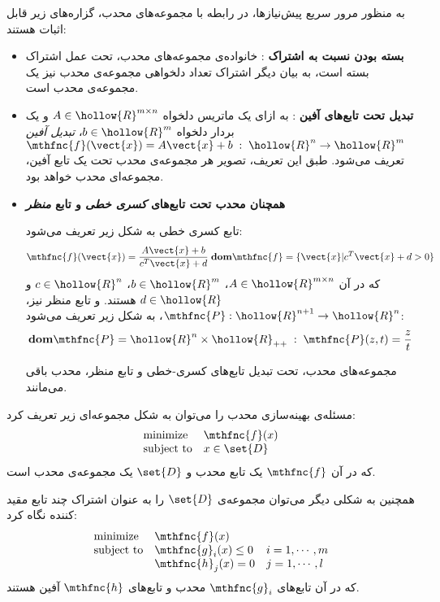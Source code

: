 به منظور مرور سریع پیش‌نیازها، در رابطه با مجموعه‌های محدب، گزاره‌های زیر قابل اثبات هستند:
\begin{itemize}
\item \textbf{
بسته بودن نسبت به اشتراک
}: 
خانواده‌ی مجموعه‌های محدب، تحت عمل اشتراک بسته است، به بیان دیگر اشتراک تعداد دلخواهی مجموعه‌ی محدب نیز یک مجموعه‌ی محدب است.

\item \textbf{
تبدیل تحت تابع‌های آفین
}: 
به ازای یک ماتریس دلخواه 
$A \in \hollow{R}^{m \times n}$ 
و یک بردار دلخواه 
$b \in \hollow{R}^{m}$، 
\textit{
تبدیل آفین
} 
$\mthfnc{f}( \vect{x} ) = A \vect{x} + b \; : \; \hollow{R}^{n} \rightarrow \hollow{R}^{m}$ 
تعریف می‌شود. طبق این تعریف، تصویر هر مجموعه‌ی محدب تحت یک تابع آفین، مجموعه‌ای محدب خواهد بود.

\item \textbf{
همچنان محدب تحت تابع‌های 
\textit{
کسری خطی
}
و تابع
\textit{
منظر
}
}

تابع کسری خطی به شکل زیر تعریف می‌شود:
\[
\mthfnc{f}( \vect{x} ) = \frac{ A \vect{x} + b }{ c^T \vect{x} + d } \; \mathbf{dom} \mthfnc{f} = \{ \vect{x} | c^T \vect{x} + d > 0 \}
\]
که در آن 
$A \in \hollow{R}^{m \times n}$، 
$b \in \hollow{R}^m$، 
$c \in \hollow{R}^{n}$ 
و 
$d \in \hollow{R}$ 
هستند. و تابع منظر نیز، 
$\mthfnc{P} : \hollow{R}^{n+1} \rightarrow \hollow{R}^n$، 
به شکل زیر تعریف می‌شود:
\[
\mathbf{dom} \mthfnc{P} = \hollow{R}^{n} \times \hollow{R}_{++} \; : \; \mthfnc{P}(z,t) = \frac{z}{t}
\]

مجموعه‌های محدب، تحت تبدیل تابع‌های کسری-خطی و تابع منظر، محدب باقی می‌مانند.





\end{itemize}




مسئله‌ی بهینه‌سازی محدب را می‌توان به شکل مجموعه‌ای زیر تعریف کرد:
\[
\begin{array}{ll}
\mbox{minimize} & \mthfnc{f}( x )\\
\mbox{subject to} & x \in \set{D}
\end{array}
\]
که در آن 
$\mthfnc{f}$ 
یک تابع محدب و 
$\set{D}$ 
یک مجموعه‌ی محدب است.

همچنین به شکلی دیگر می‌توان مجموعه‌ی 
$\set{D}$ 
را به عنوان اشتراک چند تابع مقید کننده نگاه کرد:
\[
\begin{array}{lll}
\mbox{minimize} & \mthfnc{f}( x )\\
\mbox{subject to} & \mthfnc{g}_i(x) \leq 0 & i = 1, \cdots, m\\
 & \mthfnc{h}_j(x) = 0 & j = 1, \cdots, l
\end{array}
\]
که در آن تابع‌های 
$\mthfnc{g}_i$ 
محدب و تابع‌های 
$\mthfnc{h}$ 
آفین هستند.


